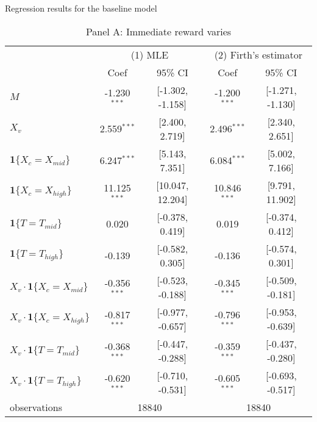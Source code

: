 \documentclass[12pt]{article}
\begin{document}
\begin{table}
    \captionsetup[sub]{singlelinecheck=false}
    \caption{Regression results for the baseline model}
    \vspace*{12pt}
    
    \begin{subtable}{\textwidth}
        \centering
        \captionsetup{justification=centering}
        \caption*{Panel A: Immediate reward varies}
\begin{tabular}{lcccc}
  \hline
   & \multicolumn{2}{c}{(1) MLE} & \multicolumn{2}{c}{(2) Firth's estimator} \\ & Coef & 95\% CI & Coef & 95\% CI \\ \hline
$M$ & -1.230$^{***}$ & [-1.302, -1.158] & -1.200$^{***}$ & [-1.271, -1.130] \\ 
  $X_v$ & 2.559$^{***}$ & [2.400, 2.719] & 2.496$^{***}$ & [2.340, 2.651] \\ 
  $\textbf{1}\{X_c = X_{mid}\}$ & 6.247$^{***}$ & [5.143, 7.351] & 6.084$^{***}$ & [5.002, 7.166] \\ 
  $\textbf{1}\{X_c = X_{high}\}$ & 11.125$^{***}$ & [10.047, 12.204] & 10.846$^{***}$ & [9.791, 11.902] \\ 
  $\textbf{1}\{T = T_{mid}\}$ & 0.020 & [-0.378, 0.419] & 0.019 & [-0.374, 0.412] \\ 
  $\textbf{1}\{T = T_{high}\}$ & -0.139 & [-0.582, 0.305] & -0.136 & [-0.574, 0.301] \\ 
  $X_v\cdot\textbf{1}\{X_c = X_{mid}\}$ & -0.356$^{***}$ & [-0.523, -0.188] & -0.345$^{***}$ & [-0.509, -0.181] \\ 
  $X_v\cdot\textbf{1}\{X_c = X_{high}\}$ & -0.817$^{***}$ & [-0.977, -0.657] & -0.796$^{***}$ & [-0.953, -0.639] \\ 
  $X_v\cdot\textbf{1}\{T = T_{mid}\}$ & -0.368$^{***}$ & [-0.447, -0.288] & -0.359$^{***}$ & [-0.437, -0.280] \\ 
  $X_v\cdot\textbf{1}\{T = T_{high}\}$ & -0.620$^{***}$ & [-0.710, -0.531] & -0.605$^{***}$ & [-0.693, -0.517] \\ 
   \hline observations & \multicolumn{2}{c}{18840} & \multicolumn{2}{c}{18840} \\ \hline
\end{tabular}

    \end{subtable}
    
    \vspace*{12pt}


\end{table}
\end{document}
